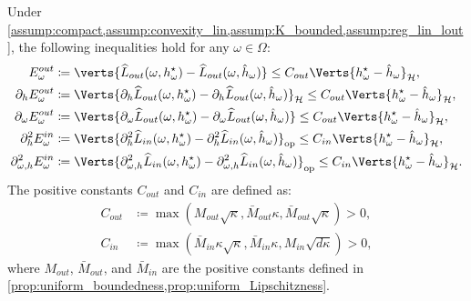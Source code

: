 \begin{proposition}\label{prop:lip_continuity_out}
Under \cref{assump:compact,assump:convexity_lin,assump:K_bounded,assump:reg_lin_lout}, the following inequalities hold for any $\omega\in\Omega$:
\begin{align*}
	\Eout &\coloneqq\verts{\widehat{L}_{out}(\omega, h^\star_\omega)-\widehat{L}_{out}(\omega, \hat{h}_\omega)}\leq C_{out}\Verts{h^\star_\omega-\hat{h}_\omega}_\mathcal{H},\\
	\Eouth&\coloneqq\Verts{\partial_h\widehat{L}_{out}(\omega, h^\star_\omega)-\partial_h\widehat{L}_{out}(\omega, \hat{h}_\omega)}_\mathcal{H} \leq C_{out}\Verts{h^\star_\omega-\hat{h}_\omega}_\mathcal{H},\\
	\Eoutw&\coloneqq\Verts{\partial_\omega\widehat{L}_{out}(\omega, h^\star_\omega)-\partial_\omega\widehat{L}_{out}(\omega, \hat{h}_\omega)} \leq C_{out}\Verts{h^\star_\omega-\hat{h}_\omega}_\mathcal{H},\\
	\Einhh&\coloneqq\Verts{\partial_h^2\widehat{L}_{in}(\omega, h^\star_\omega)-\partial_h^2\widehat{L}_{in}(\omega, \hat{h}_\omega)}_{\op}\leq C_{in}\Verts{h^\star_\omega-\hat{h}_\omega}_\mathcal{H},\\
	\Einwh&\coloneqq\Verts{\partial_{\omega, h}^2\widehat{L}_{in}(\omega, h^\star_\omega)-\partial_{\omega, h}^2\widehat{L}_{in}(\omega, \hat{h}_\omega)}_{\op} \leq C_{in}\Verts{h^\star_\omega-\hat{h}_\omega}_\mathcal{H}.
\end{align*}
The positive constants $C_{out}$ and $C_{in}$ are defined as:
\begin{align*}
    C_{out}&\coloneqq\max\left(M_{out}\sqrt{\kappa},\bar{M}_{out}\kappa,\bar{M}_{out}\sqrt{\kappa}\right)>0,\\
    C_{in}&\coloneqq\max\left(\bar{M}_{in}\kappa\sqrt{\kappa},\bar{M}_{in}\kappa,M_{in}\sqrt{d\kappa}\right)>0,
\end{align*}
where $M_{out}$, $\bar{M}_{out}$, and $\bar{M}_{in}$ are the positive constants defined in \cref{prop:uniform_boundedness,prop:uniform_Lipschitzness}.
\end{proposition}

